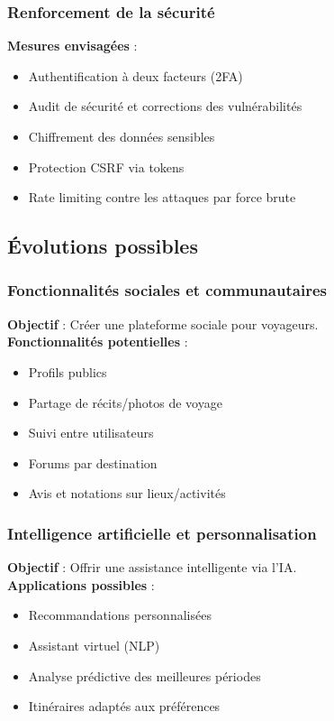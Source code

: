 \documentclass[a4paper,12pt]{article}
\begin{document}
\subsubsection{Renforcement de la sécurité}
\textbf{Mesures envisagées} :
\begin{itemize}
  \item Authentification à deux facteurs (2FA)
  \item Audit de sécurité et corrections des vulnérabilités
  \item Chiffrement des données sensibles
  \item Protection CSRF via tokens
  \item Rate limiting contre les attaques par force brute
\end{itemize}

\subsection{Évolutions possibles}

\subsubsection{Fonctionnalités sociales et communautaires}
\textbf{Objectif} : Créer une plateforme sociale pour voyageurs.\\
\textbf{Fonctionnalités potentielles} :
\begin{itemize}
  \item Profils publics
  \item Partage de récits/photos de voyage
  \item Suivi entre utilisateurs
  \item Forums par destination
  \item Avis et notations sur lieux/activités
\end{itemize}

\subsubsection{Intelligence artificielle et personnalisation}
\textbf{Objectif} : Offrir une assistance intelligente via l'IA.\\
\textbf{Applications possibles} :
\begin{itemize}
  \item Recommandations personnalisées
  \item Assistant virtuel (NLP)
  \item Analyse prédictive des meilleures périodes
  \item Itinéraires adaptés aux préférences
\end{itemize}
\end{document}
